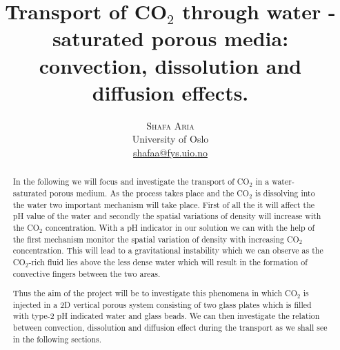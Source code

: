 \documentclass[twoside]{article}
\title{\vspace{-15mm}\fontsize{24pt}{10pt}\selectfont\textbf{Transport of CO$_2$ through water - saturated porous media: convection, dissolution and diffusion effects.}} %
\author{
\large
\textsc{Shafa Aria}\\[2mm] %
\normalsize University of Oslo \\ %
\normalsize \href{shafaa@fys.uio.no}{shafaa@fys.uio.no} %
\vspace{-5mm}
}
\date{}
\begin{document}
\maketitle %

\thispagestyle{fancy} %


\begin{abstract}
In the following we will focus and investigate the transport of CO$_2$ in a water-saturated porous medium. As the process takes place and the CO$_2$ is dissolving into the water two important mechanism will take place. First of all the it will affect the pH value of the water and secondly the spatial variations of density will increase with the CO$_2$ concentration. With a pH indicator in our solution we can with the help of the first mechanism monitor the spatial variation of density with increasing CO$_2$ concentration. This will lead to a gravitational instability which we can observe as the CO$_2$-rich fluid lies above the less dense water which will result in the formation of convective fingers between the two areas. 

Thus the aim of the project will be to investigate this phenomena in which CO$_2$ is injected in a 2D vertical porous system consisting of two glass plates which is filled with type-2 pH indicated water and glass beads. We can then investigate the relation between convection, dissolution and diffusion effect during the transport as we shall see in the following sections.
\end{abstract}

\end{document}

